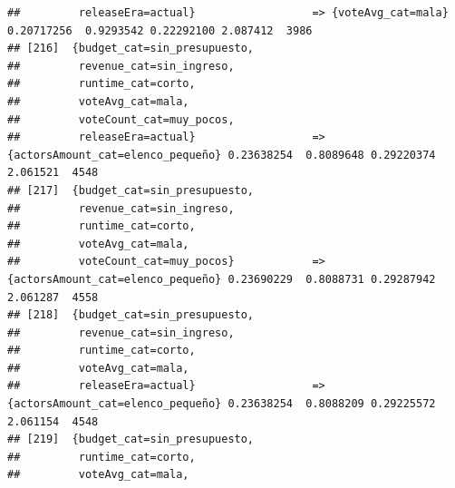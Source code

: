\documentclass[
]{article}
\begin{document}
\begin{verbatim}
##         releaseEra=actual}                  => {voteAvg_cat=mala}                0.20717256  0.9293542 0.22292100 2.087412  3986
## [216]  {budget_cat=sin_presupuesto,                                                                                             
##         revenue_cat=sin_ingreso,                                                                                                
##         runtime_cat=corto,                                                                                                      
##         voteAvg_cat=mala,                                                                                                       
##         voteCount_cat=muy_pocos,                                                                                                
##         releaseEra=actual}                  => {actorsAmount_cat=elenco_pequeño} 0.23638254  0.8089648 0.29220374 2.061521  4548
## [217]  {budget_cat=sin_presupuesto,                                                                                             
##         revenue_cat=sin_ingreso,                                                                                                
##         runtime_cat=corto,                                                                                                      
##         voteAvg_cat=mala,                                                                                                       
##         voteCount_cat=muy_pocos}            => {actorsAmount_cat=elenco_pequeño} 0.23690229  0.8088731 0.29287942 2.061287  4558
## [218]  {budget_cat=sin_presupuesto,                                                                                             
##         revenue_cat=sin_ingreso,                                                                                                
##         runtime_cat=corto,                                                                                                      
##         voteAvg_cat=mala,                                                                                                       
##         releaseEra=actual}                  => {actorsAmount_cat=elenco_pequeño} 0.23638254  0.8088209 0.29225572 2.061154  4548
## [219]  {budget_cat=sin_presupuesto,                                                                                             
##         runtime_cat=corto,                                                                                                      
##         voteAvg_cat=mala,                                                                                                       

\end{verbatim}
\end{document}

